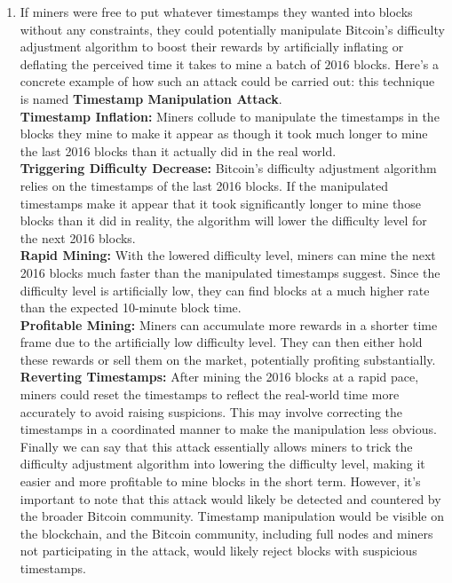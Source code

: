 \documentclass{article}
\begin{document}
\begin{enumerate}
    \item If miners were free to put whatever timestamps they wanted into blocks without any constraints, they could potentially manipulate Bitcoin's difficulty adjustment algorithm to boost their rewards by artificially inflating or deflating the perceived time it takes to mine a batch of $2016$ blocks. Here's a concrete example of how such an attack could be carried out: this technique is named \textbf{Timestamp Manipulation Attack}.\\
    \textbf{Timestamp Inflation:} Miners collude to manipulate the timestamps in the blocks they mine to make it appear as though it took much longer to mine the last 2016 blocks than it actually did in the real world.\\
    \textbf{Triggering Difficulty Decrease:} Bitcoin's difficulty adjustment algorithm relies on the timestamps of the last 2016 blocks. If the manipulated timestamps make it appear that it took significantly longer to mine those blocks than it did in reality, the algorithm will lower the difficulty level for the next 2016 blocks.\\
    \textbf{Rapid Mining:} With the lowered difficulty level, miners can mine the next 2016 blocks much faster than the manipulated timestamps suggest. Since the difficulty level is artificially low, they can find blocks at a much higher rate than the expected 10-minute block time.\\
    \textbf{ Profitable Mining:} Miners can accumulate more rewards in a shorter time frame due to the artificially low difficulty level. They can then either hold these rewards or sell them on the market, potentially profiting substantially.\\
    \textbf{Reverting Timestamps: } After mining the 2016 blocks at a rapid pace, miners could reset the timestamps to reflect the real-world time more accurately to avoid raising suspicions. This may involve correcting the timestamps in a coordinated manner to make the manipulation less obvious.\\
    
    Finally we can say that this attack essentially allows miners to trick the difficulty adjustment algorithm into lowering the difficulty level, making it easier and more profitable to mine blocks in the short term. However, it's important to note that this attack would likely be detected and countered by the broader Bitcoin community. Timestamp manipulation would be visible on the blockchain, and the Bitcoin community, including full nodes and miners not participating in the attack, would likely reject blocks with suspicious timestamps.\\


\end{enumerate}
\end{document}
